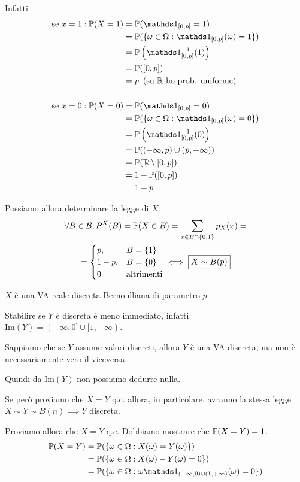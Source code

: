 \begin{enumerate}
Infatti
\begin{align*}
\text{se} \ x=1:\PP( X=1) & =\PP(\Ind_{[ 0,p]} =1)\\
 & =\PP(\{\omega \in \Omega :\Ind_{[ 0,p]}( \omega ) =1\})\\
 & =\PP\left(\Ind_{[ 0,p]}^{-1}( 1)\right)\\
 & =\PP([ 0,p])\\
 & =p\ \left(\text{su} \ \mathbb{R} \ \text{ho prob. uniforme}\right)\\
 & \\
\text{se} \ x=0:\PP( X=0) & =\PP(\Ind_{[ 0,p]} =0)\\
 & =\PP(\{\omega \in \Omega :\Ind_{[ 0,p]}( \omega ) =0\})\\
 & =\PP\left(\Ind_{[ 0,p]}^{-1}( 0)\right)\\
 & =\PP(( -\infty ,p) \cup ( p,+\infty ))\\
 & =\PP(\mathbb{R} \setminus [ 0,p])\\
 & =1-\PP([ 0,p])\\
 & =1-p
\end{align*}

Possiamo allora determinare la legge di $X$\begin{gather*}
\forall B\in \mathcal{B} ,P^{X}( B) =\mathbb{P}( X\in B) =\sum\limits _{x\in B\cap \{0,1\}} p_{X}( x) =\\
=\begin{cases}
p, & B=\{1\}\\
1-p, & B=\{0\}\\
0 & \text{altrimenti}
\end{cases}
\iff \boxed{X\sim B( p)}
\end{gather*}

$X$ è una VA reale discreta Bernoulliana di parametro $p$.

Stabilire se $Y$ è discreta è meno immediato, infatti $\mathrm{Im}( Y) =( -\infty ,0] \cup [ 1,+\infty )$.

\begin{oss}
Sappiamo che se $Y$ assume valori discreti, allora $Y$ è una VA discreta, ma non è necessariamente vero il viceversa.
\end{oss}

Quindi da $\mathrm{Im}( Y)$ non possiamo dedurre nulla.

Se però proviamo che $X=Y$ q.c. allora, in particolare, avranno la stessa legge $X\sim Y\sim B( n) \implies Y$ discreta.

Proviamo allora che $X=Y$ q.c. Dobbiamo mostrare che $\mathbb{P}( X=Y) =1$.\begin{align*}
\PP( X=Y) & =\PP(\{\omega \in \Omega :X( \omega ) =Y( \omega )\})\\
 & =\PP(\{\omega \in \Omega :X( \omega ) -Y( \omega ) =0\})\\
 & =\PP(\{\omega \in \Omega :\omega \Ind_{( -\infty ,0) \cup ( 1,+\infty )}( \omega ) =0\})
\end{align*}


\end{enumerate}
